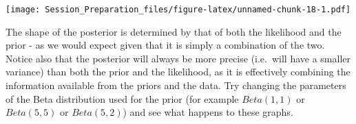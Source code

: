 \documentclass[
  12pt,
]{article}
\newenvironment{Shaded}{\begin{snugshade}}{\end{snugshade}}
\newcommand{\AttributeTok}[1]{\textcolor[rgb]{0.77,0.63,0.00}{#1}}
\newcommand{\ConstantTok}[1]{\textcolor[rgb]{0.00,0.00,0.00}{#1}}
\newcommand{\ControlFlowTok}[1]{\textcolor[rgb]{0.13,0.29,0.53}{\textbf{#1}}}
\newcommand{\DecValTok}[1]{\textcolor[rgb]{0.00,0.00,0.81}{#1}}
\newcommand{\FunctionTok}[1]{\textcolor[rgb]{0.00,0.00,0.00}{#1}}
\newcommand{\NormalTok}[1]{#1}
\newcommand{\OtherTok}[1]{\textcolor[rgb]{0.56,0.35,0.01}{#1}}
\newcommand{\SpecialCharTok}[1]{\textcolor[rgb]{0.00,0.00,0.00}{#1}}
\newcommand{\StringTok}[1]{\textcolor[rgb]{0.31,0.60,0.02}{#1}}
\begin{document}
\begin{Shaded}
\end{Shaded}

\texttt{[image: Session\_Preparation\_files/figure-latex/unnamed-chunk-18-1.pdf]}

The shape of the posterior is determined by that of both the likelihood
and the prior - as we would expect given that it is simply a combination
of the two. Notice also that the posterior will always be more precise
(i.e.~will have a smaller variance) than both the prior and the
likelihood, as it is effectively combining the information available
from the priors and the data. Try changing the parameters of the Beta
distribution used for the prior (for example \(Beta(1,1)\) or
\(Beta(5,5)\) or \(Beta(5,2)\)) and see what happens to these graphs.
\end{document}
